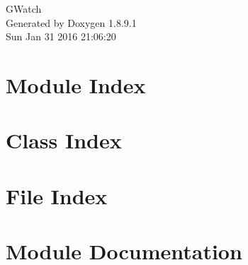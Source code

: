 \documentclass[twoside]{book}
\newcommand{\+}{\discretionary{\mbox{\scriptsize$\hookleftarrow$}}{}{}}
\newcommand{\clearemptydoublepage}{%
  \newpage{\pagestyle{empty}\cleardoublepage}%
}
\begin{document}
\hypersetup{pageanchor=false,
             bookmarks=true,
             bookmarksnumbered=true,
             pdfencoding=unicode
            }
\begin{titlepage}
\vspace*{7cm}
\begin{center}%
{\Large G\+Watch }\\
\vspace*{1cm}
{\large Generated by Doxygen 1.8.9.1}\\
\vspace*{0.5cm}
{\small Sun Jan 31 2016 21:06:20}\\
\end{center}
\end{titlepage}
\clearemptydoublepage
\tableofcontents
\clearemptydoublepage
{}
\hypersetup{pageanchor=true}

\chapter{Module Index}

\chapter{Class Index}

\chapter{File Index}

\chapter{Module Documentation}




\end{document}
